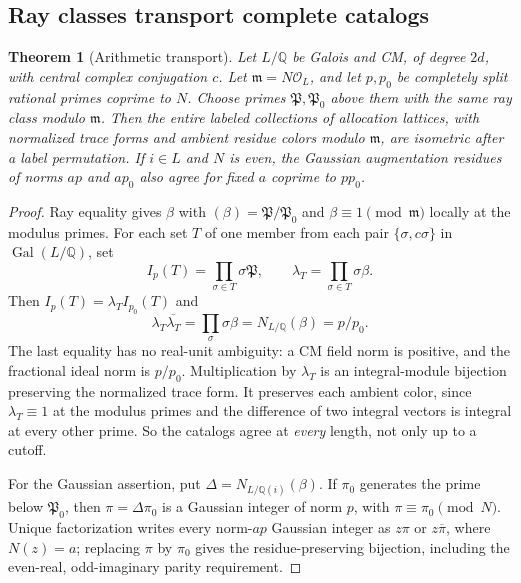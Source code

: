 \documentclass[11pt]{article}
\newtheorem{theorem}{Theorem}[section]
\theoremstyle{definition}
\theoremstyle{remark}
\begin{document}
\subsection{Ray classes transport complete catalogs}
\begin{theorem}[Arithmetic transport]\label{thm:ray-transport}
Let $L/\mathbb Q$ be Galois and CM, of degree $2d$, with central complex
conjugation $c$. Let $\mathfrak m=N\mathcal O_L$, and let $p,p_0$ be
completely split rational primes coprime to $N$. Choose primes
$\mathfrak P,\mathfrak P_0$ above them with the same ray class modulo
$\mathfrak m$. Then the entire labeled collections of allocation lattices,
with normalized trace forms and ambient residue colors modulo
$\mathfrak m$, are isometric after a label permutation. If $i\in L$ and
$N$ is even, the Gaussian augmentation residues of norms $ap$ and $ap_0$
also agree for fixed $a$ coprime to $pp_0$.
\end{theorem}
\begin{proof}
Ray equality gives $\beta$ with $(\beta)=\mathfrak P/\mathfrak P_0$
and $\beta\equiv1\pmod{\mathfrak m}$ locally at the modulus primes.
For each set $T$ of one member from each pair $\{\sigma,c\sigma\}$
in $\operatorname{Gal}(L/\mathbb Q)$, set
\[
 I_p(T)=\prod_{\sigma\in T}\sigma\mathfrak P,
 \qquad\lambda_T=\prod_{\sigma\in T}\sigma\beta.
\]
Then $I_p(T)=\lambda_T I_{p_0}(T)$ and
\[
 \lambda_T\overline{\lambda_T}
 =\prod_{\sigma}\sigma\beta
 =N_{L/\mathbb Q}(\beta)=p/p_0.
\]
The last equality has no real-unit ambiguity: a CM field norm is positive,
and the fractional ideal norm is $p/p_0$. Multiplication by $\lambda_T$
is an integral-module bijection preserving the normalized trace form. It
preserves each ambient color, since $\lambda_T\equiv1$ at the modulus
primes and the difference of two integral vectors is integral at every
other prime. So the catalogs agree at \emph{every} length, not only up to
a cutoff.

For the Gaussian assertion, put $\Delta=N_{L/\mathbb Q(i)}(\beta)$.
If $\pi_0$ generates the prime below $\mathfrak P_0$, then
$\pi=\Delta\pi_0$ is a Gaussian integer of norm $p$, with
$\pi\equiv\pi_0\pmod N$. Unique factorization writes every norm-$ap$
Gaussian integer as $z\pi$ or $z\overline\pi$, where $N(z)=a$;
replacing $\pi$ by $\pi_0$ gives the residue-preserving bijection,
including the even-real, odd-imaginary parity requirement.
\end{proof}
\end{document}
